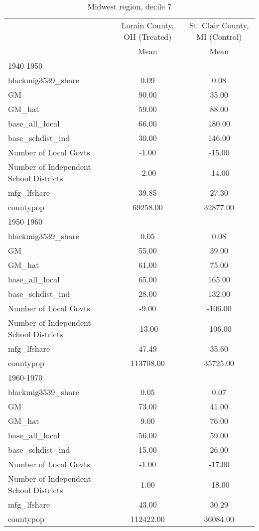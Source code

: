 \begin{table}[htbp]\centering
\def\sym#1{\ifmmode^{#1}\else\(^{#1}\)\fi}
\caption{Midwest region, decile 7 \label{tab1}}
\begin{tabular}{l*{2}{c}}
\toprule
                    &\multicolumn{1}{c}{Lorain County, OH (Treated)}&\multicolumn{1}{c}{St. Clair County, MI (Control)}\\
                    &        Mean&        Mean\\
\midrule
1940-1950           &            &            \\
blackmig3539\_share  &        0.09&        0.08\\
GM                  &       90.00&       35.00\\
GM\_hat              &       59.00&       88.00\\
base\_all\_local      &       66.00&      180.00\\
base\_schdist\_ind    &       30.00&      146.00\\
Number of Local Govts&       -1.00&      -15.00\\
Number of Independent School Districts&       -2.00&      -14.00\\
mfg\_lfshare         &       39.85&       27.30\\
countypop           &    69258.00&    32877.00\\
\midrule
1950-1960           &            &            \\
blackmig3539\_share  &        0.05&        0.08\\
GM                  &       55.00&       39.00\\
GM\_hat              &       61.00&       75.00\\
base\_all\_local      &       65.00&      165.00\\
base\_schdist\_ind    &       28.00&      132.00\\
Number of Local Govts&       -9.00&     -106.00\\
Number of Independent School Districts&      -13.00&     -106.00\\
mfg\_lfshare         &       47.49&       35.60\\
countypop           &   113708.00&    35725.00\\
\midrule
1960-1970           &            &            \\
blackmig3539\_share  &        0.05&        0.07\\
GM                  &       73.00&       41.00\\
GM\_hat              &        9.00&       76.00\\
base\_all\_local      &       56.00&       59.00\\
base\_schdist\_ind    &       15.00&       26.00\\
Number of Local Govts&       -1.00&      -17.00\\
Number of Independent School Districts&        1.00&      -18.00\\
mfg\_lfshare         &       43.00&       30.29\\
countypop           &   112422.00&    36084.00\\
\bottomrule
\end{tabular}
\end{table}
